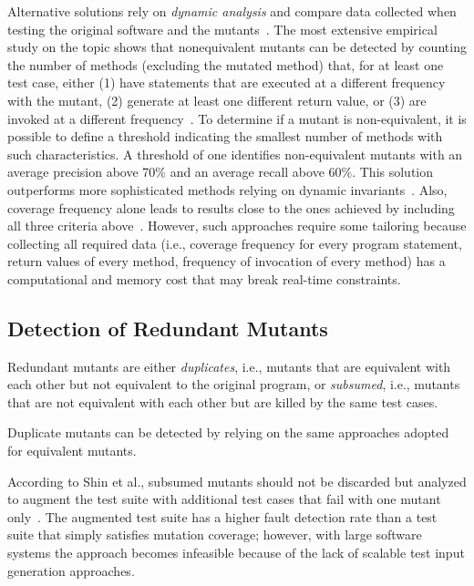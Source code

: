 Alternative solutions rely on \emph{dynamic analysis} and compare data collected when testing the original software and the mutants~\cite{grun2009impact,schuler2010covering,schuler2013covering,schuler2009efficient}.
The most extensive empirical study on the topic shows that nonequivalent mutants can be detected by counting the number of methods (excluding the mutated method) that, for at least one test case, either (1) have statements that are executed at a different frequency with the mutant, (2) generate at least one different return value, or (3) are invoked at a different frequency~\cite{schuler2013covering}. To determine if a mutant is non-equivalent, it is possible to define a threshold indicating the smallest number of methods with such characteristics. A threshold of one identifies non-equivalent mutants with an average precision above 70\% and an average recall above 60\%. This solution outperforms more sophisticated methods relying on dynamic invariants~\cite{schuler2009efficient}. Also, coverage frequency alone leads to results close to the ones achieved by including all three criteria above~\cite{schuler2013covering}.
However, such approaches require some tailoring
because collecting all required data
(i.e., coverage frequency for every program statement, return values of every method, frequency of invocation of every method) has a computational and memory cost that may break real-time constraints.

\subsection{Detection of Redundant Mutants}
\label{sec:background:redundant}
Redundant mutants are either \emph{duplicates}, i.e., mutants that are equivalent with each other but not equivalent to the original program, or \emph{subsumed}, i.e., mutants that are not equivalent with each other but are killed by the same test cases.

Duplicate mutants can be detected by relying on the same approaches adopted for equivalent mutants.

According to Shin et al., subsumed mutants should not be discarded but analyzed to augment the test suite with additional test cases that fail with one mutant only~\cite{Shin:TSE:DCriterion:2018}.
The augmented test suite has a higher
 fault detection rate than a test suite that simply satisfies mutation coverage; however, with large software systems the approach becomes infeasible because of the lack of scalable test input generation approaches.

